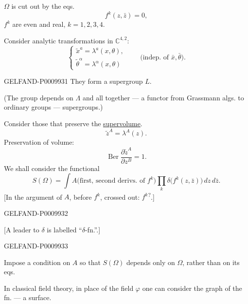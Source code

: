 $\Omega$ is cut out by the eqs.
\[
f^k(z,\bar z)=0,
\]
$f^k$ are even and real, \quad $k=1,2,3,4$.

Consider analytic transformations in $\mathbb C^{4,2}$:
\[
\begin{cases}
\widetilde{x}^{a}=\lambda^{a}(x,\theta),\\
\widetilde{\theta}^{\alpha}=\lambda^{\alpha}(x,\theta)
\end{cases}
\qquad
\text{(indep. of $\bar x,\bar\theta$)}.
\]


\begin{GelfandAdjacentEvidence}{GELFAND-P000993}{1}
They form a supergroup $L$.

(The group depends on $\Lambda$ and all together --- a functor from Grassmann algs. to ordinary groups --- supergroups.)

Consider those that preserve the \underline{supervolume}.
\[
\widetilde z^{A}=\lambda^{A}(z).
\]
Preservation of volume:
\[
\operatorname{Ber}\frac{\partial\widetilde z^{A}}{\partial z^{B}}=1.
\]
We shall consider the functional
\[
S(\Omega)=\int A\bigl(\text{first, second derivs. of }f^k\bigr)
\prod_k\delta\bigl(f^k(z,\bar z)\bigr)\,dz\,d\bar z.
\]
[In the argument of $A$, before $f^k$, crossed out: $f^k$\textsuperscript{?}.]
\end{GelfandAdjacentEvidence}
\begin{GelfandAdjacentEvidence}{GELFAND-P000993}{2}


[A leader to $\delta$ is labelled “$\delta$-fn.”.]
\end{GelfandAdjacentEvidence}
\begin{GelfandAdjacentEvidence}{GELFAND-P000993}{3}


Impose a condition on $A$ so that $S(\Omega)$ depends only on $\Omega$, rather than on its eqs.

In classical field theory, in place of the field $\varphi$ one can consider the graph of the fn. --- a surface.

\end{GelfandAdjacentEvidence}
